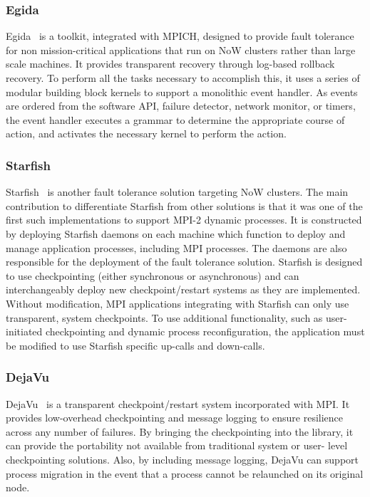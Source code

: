 \subsubsection{Egida}

Egida~\cite{Rao:1999us} is a toolkit, integrated with MPICH, designed to provide 
fault tolerance for non mission-critical applications that run on NoW clusters rather than large scale machines. It provides 
transparent recovery through log-based rollback recovery. To perform all the 
tasks necessary to accomplish this, it uses a series of modular building block 
kernels to support a monolithic event handler. As events are ordered from the software API, failure 
detector, network monitor, or timers, the event handler executes a grammar to 
determine the appropriate course of action, and activates the necessary kernel 
to perform the action.

\subsubsection{Starfish}

Starfish~\cite{Agbaria:1999th} is another fault tolerance solution targeting NoW 
clusters. The main contribution to differentiate Starfish from other solutions 
is that it was one of the first such implementations to support MPI-2 dynamic 
processes. It is constructed by deploying Starfish daemons on each machine which 
function to deploy and manage application processes, including MPI processes. 
The daemons are also responsible for the deployment of the fault tolerance 
solution. Starfish is designed to use checkpointing (either synchronous or 
asynchronous) and can interchangeably deploy new checkpoint/restart systems as they are 
implemented. Without modification, MPI applications integrating with Starfish 
can only use transparent, system checkpoints. To use additional functionality, 
such as user-initiated checkpointing and dynamic process reconfiguration, the 
application must be modified to use Starfish specific up-calls and down-calls.

\subsubsection{DejaVu}

DejaVu~\cite{Ruscio:2007wm} is a transparent checkpoint/restart system incorporated 
with MPI. It provides low-overhead checkpointing and message logging to ensure 
resilience across any number of failures. By bringing the checkpointing into the 
library, it can provide the portability not available from traditional system or user-
level checkpointing solutions. Also, by including message logging, DejaVu can support 
process migration in the event that a process cannot be relaunched on its original 
node.

